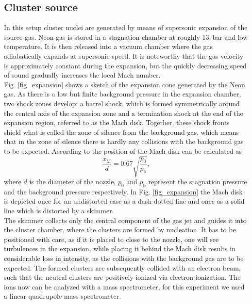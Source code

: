 \documentclass[a4paper,10pt]{article}
\begin{document}
\subsection{Cluster source}
In this setup cluster nuclei are generated by means of supersonic expansion of the source gas. Neon gas is stored in a stagnation chamber at roughly \SI{13}{\bar} and low temperature. It is then released into a vacuum chamber where the gas adiabatically expands at supersonic speed. It is noteworthy that the gas velocity is approximately constant during the expansion, but the quickly decreasing speed of sound gradually increases the local Mach number. \\
Fig. \ref{fig_expansion} shows a sketch of the expansion cone generated by the Neon gas. As there is a low but finite background pressure in the expansion chamber, two shock zones develop: a barrel shock, which is formed symmetrically around the central axis of the expansion zone and a termination shock at the end of the expansion region, referred to as the Mach disk. Together, these shock fronts shield what is called the zone of silence from the background gas, which means that in the zone of silence there is hardly any collisions with the background gas to be expected. According to \cite{script} the position of the Mach disk can be calculated as
\begin{equation}
	\frac{x_\mathrm{M}}{d} = 0.67 \sqrt{\frac{p_0}{p_\mathrm{b}}},
\end{equation}
where $d$ is the diameter of the nozzle, $p_0$ and $p_\mathrm{b}$ represent the stagnation pressure and the background pressure respectively. In Fig. \ref{fig_expansion} the Mach disk is depicted once for an undistorted case as a dash-dotted line and once as a solid line which is distorted by a skimmer. \\
The skimmer collects only the central component of the gas jet and guides it into the cluster chamber, where the clusters are formed by nucleation. It has to be positioned with care, as if it is placed to close to the nozzle, one will see turbulences in the expansion, while placing it behind the Mach disk results in considerable loss in intensity, as the collisions with the background gas are to be expected. The formed clusters are subsequently collided with an electron beam, such that the neutral clusters are positively ionized via electron ionization. The ions now can be analyzed with a mass spectrometer, for this experiment we used a linear quadrupole mass spectrometer.%
\end{document}
